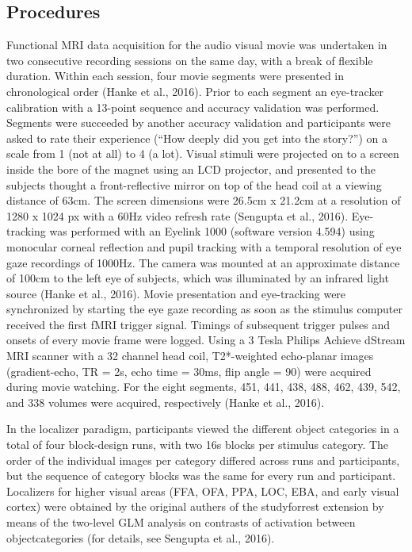 \documentclass[a4paper, 12pt]{scrreprt}
\begin{document}
\subsection{Procedures}
Functional MRI data acquisition for the audio visual movie was undertaken in two consecutive recording sessions on the same day, with a break of flexible duration. Within each session, four movie segments were presented in chronological order (Hanke et al., 2016).  Prior to each segment an eye-tracker calibration with a 13-point sequence and accuracy validation was performed.
Segments were succeeded by another accuracy validation and participants were asked to rate their experience (“How deeply did you get into the story?”) on a scale from 1 (not at all) to 4 (a lot). Visual stimuli were projected on to a screen inside the bore of the magnet using an LCD projector, and presented to the subjects thought a front-reflective mirror on top of the head
coil at a viewing distance of 63cm. The screen dimensions were 26.5cm x 21.2cm at a resolution of 1280 x 1024 px with a 60Hz video refresh rate (Sengupta et al., 2016). Eye-tracking was performed with an Eyelink 1000 (software version 4.594) using monocular corneal reflection and pupil tracking with a temporal resolution of eye gaze recordings of 1000Hz. The camera was mounted at an approximate distance of 100cm to the left eye of subjects, which was illuminated
by an infrared light source (Hanke et al., 2016). Movie presentation and eye-tracking were synchronized by starting the eye gaze recording as soon as the stimulus computer received the first fMRI trigger signal. Timings of subsequent trigger pulses and onsets of every movie frame
were logged. Using a 3 Tesla Philips Achieve dStream MRI scanner with a 32 channel head coil, T2*-weighted echo-planar images (gradient-echo, TR = 2s, echo time = 30ms, flip angle = 90) were acquired during movie watching. For the eight segments, 451, 441, 438, 488, 462, 439, 542, and 338 volumes were acquired, respectively (Hanke et al., 2016).

In the localizer paradigm, participants viewed the different object categories in a total of four block-design runs, with two 16s blocks per stimulus category. The order of the individual images per category differed across runs and participants, but the sequence of category blocks was the same for every run and participant. Localizers for higher visual areas (FFA, OFA, PPA, LOC, EBA, and early visual cortex) were obtained by the original authers of the studyforrest extension by means of the two-level GLM analysis on contrasts of activation between objectcategories (for details, see Sengupta et al., 2016).
\end{document}
